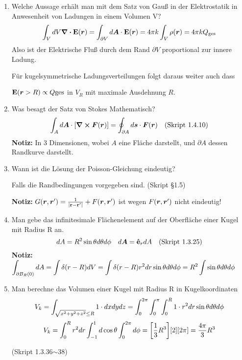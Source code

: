 \begin{enumerate}
  \item Welche Aussage erhält man mit dem Satz von Gauß in der 
        Elektrostatik in Anwesenheit von Ladungen in einem Volumen V?
        \begin{equation*}
          \int_V dV \div \vb E(\vb* r) 
          = \int_{\partial V} d\vb* A \cdot \vb E(\vb* r) 
          = 4\pi k \int_V \rho(\vb* r)
          = 4\pi k Q_{\text{ges}}
        \end{equation*}
        Also ist der Elektrische Fluß durch dem Rand $\partial V$ 
        proportional zur innere Ladung.

        Für kugelsymmetrische Ladungsverteilungen folgt daraus weiter auch
        dass 
        \begin{center}
        $\vb E(\vb* r > R)\propto Q{\text{ges}}$ in $V_R$ mit maximale
        Ausdehnung $R$.
        \end{center}

  \item Was besagt der Satz von Stokes Mathematisch?
        $$\displaystyle \int_A d\vb* A \cdot \qty[\curl \vb* F(\vb* r)]=
         \oint_{\partial A}d\vb* s\cdot \vb* F(\vb* r)
         \quad\text{(Skript 1.4.10)}$$
        \textbf{Notiz:} In 3 Dimensionen, wobei $A$ eine Fläche 
        darstellt,
        und $\partial A$ dessen Randkurve darstellt.

  \item Wann ist die Lösung der Poisson-Gleichung eindeutig?
        \begin{center}
          Falls die Randbedingungen vorgegeben sind. (Skript §1.5)
        \end{center}
        \textbf{Notiz:} $G(\vb* r, \vb* r')=\frac{1}{\abs{\vb{r}-\vb{r}'}} + F(\vb* r, \vb* r')$ 
        ist wegen $F(\vb* r, \vb* r')$ nicht eindeutig!
        
  \item Man gebe das infinitesimale Flächenelement auf der Oberfläche 
        einer Kugel mit Radius R an.
        $$\displaystyle dA = R^2\sin\theta d\theta d\phi
        \quad d\vb* A = \vu e_r dA \quad\text{(Skript 1.3.25)}$$
        \textbf{Notiz:} $\displaystyle\int_{\partial B_R(0)} dA=\int\delta(r-R)dV
         =\int \delta(r-R)r^2dr\sin\theta d\theta d\phi
         =R^2 \int \sin\theta d\theta d\phi$

  \item Man berechne das Volumen einer Kugel mit Radius R 
        in Kugelkoordinaten\\
        $$\displaystyle V_k=\int_{\sqrt{x^2+y^2+z^2}\le R} 1\cdot dxdydz
         =\int_0^{2\pi}\int_0^\pi\int_0^R 1\cdot r^2dr 
          \sin\theta d\theta d\phi$$
        $$\displaystyle V_k=\int_0^R r^2 dr \int_{-1}^{1} d\cos\theta 
                 \int_0^{2\pi}d\phi
         =\qty[\frac{1}{3}R^3]\qty[2]\qty[2\pi]=\frac{4\pi}{3}R^3$$
        \begin{center}
          (Skript 1.3.36$\sim$38)
        \end{center}


\end{enumerate}
